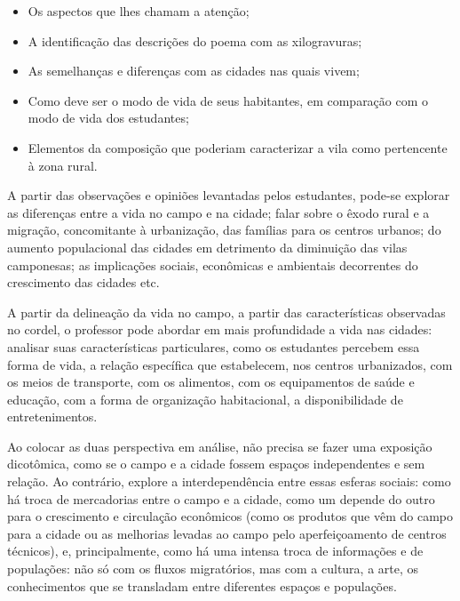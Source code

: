 \documentclass[11pt]{extarticle}
\begin{document}
\begin{itemize}
\item Os aspectos que lhes chamam a atenção;

\item A identificação das descrições do poema com as xilogravuras;

\item As semelhanças e diferenças com as cidades nas quais vivem;

\item Como deve ser o modo de vida de seus habitantes, em comparação com o modo de vida dos estudantes;

\item Elementos da composição que poderiam caracterizar a vila como pertencente à zona rural.

\end{itemize}

A partir das observações e opiniões levantadas pelos estudantes, pode-se explorar as diferenças entre a vida no campo e na cidade; falar sobre o êxodo rural e a migração, concomitante à urbanização, das famílias para os centros urbanos; do aumento populacional das cidades em detrimento da diminuição das vilas camponesas; as implicações sociais, econômicas e ambientais decorrentes do crescimento das cidades etc.

A partir da delineação da vida no campo, a partir das características observadas no cordel, o professor pode abordar em mais profundidade a vida nas cidades: analisar suas características particulares, como os estudantes percebem essa forma de vida, a relação específica que estabelecem, nos centros urbanizados, com os meios de transporte, com os alimentos, com os equipamentos de saúde e educação, com a forma de organização habitacional, a disponibilidade de entretenimentos.

Ao colocar as duas perspectiva em análise, não precisa se fazer uma exposição dicotômica, como se o campo e a cidade fossem espaços independentes e sem relação. Ao contrário, explore a interdependência entre essas esferas sociais: como há troca de mercadorias entre o campo e a cidade, como um depende do outro para o crescimento e circulação econômicos (como os produtos que vêm do campo para a cidade ou as melhorias levadas ao campo pelo aperfeiçoamento de centros técnicos), e, principalmente, como há uma intensa troca de informações e de populações: não só com os fluxos migratórios, mas com a cultura, a arte, os conhecimentos que se transladam entre diferentes espaços e populações.
\end{document}
